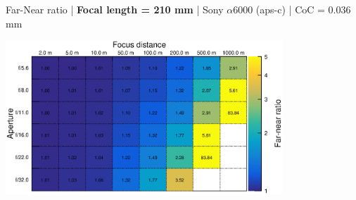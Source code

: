 \documentclass[aspectratio=169]{beamer}
\begin{document}
\begin{frame}[plain]{}
  \vspace{1ex}
  \centering
  Far-Near ratio | {\bf Focal length = 210 mm} |  Sony $\alpha$\hspace{0.1em}6000 (aps-c) | CoC = 0.036 mm
  
  \includegraphics[center,width=0.78\textwidth]{img/far-near-ratio_focl210.eps}
\end{frame}
\end{document}
